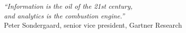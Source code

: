 \cleardoublepage
\thispagestyle{plain}

\vspace*{8cm}

\begin{flushright}
  \textsl{``Information is the oil of the 21st century,\\and analytics is the combustion engine.''}\\
\vspace*{1.5cm}
    Peter Sondergaard, senior vice president, Gartner Research
\end{flushright}





